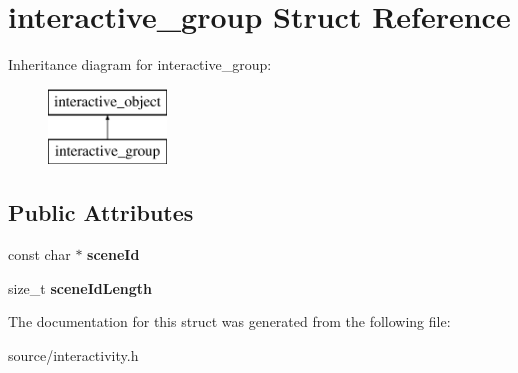\hypertarget{structinteractive__group}{}\section{interactive\+\_\+group Struct Reference}
\label{structinteractive__group}
Inheritance diagram for interactive\+\_\+group\+:\begin{figure}[H]
\begin{center}
\leavevmode
\includegraphics[height=2.000000cm]{structinteractive__group}
\end{center}
\end{figure}
\subsection*{Public Attributes}
\begin{DoxyCompactItemize}
\item 
\mbox{\label{structinteractive__group_abc4b7f7f22871d5cc955fea0f0a13343}} 
const char $\ast$ {\bfseries scene\+Id}
\item 
\mbox{\label{structinteractive__group_a61c79cda8f163f6b0bb2e5147af15c56}} 
size\+\_\+t {\bfseries scene\+Id\+Length}
\end{DoxyCompactItemize}


The documentation for this struct was generated from the following file\+:\begin{DoxyCompactItemize}
\item 
source/interactivity.\+h\end{DoxyCompactItemize}
